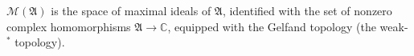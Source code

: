 
$\mathcal{M}(\mathfrak{A})$ is the space of maximal ideals of $\mathfrak{A}$, identified with the set of nonzero complex homomorphisms $\mathfrak{A} \to \mathbb{C}$, equipped with the Gelfand topology (the weak-$^*$ topology).
